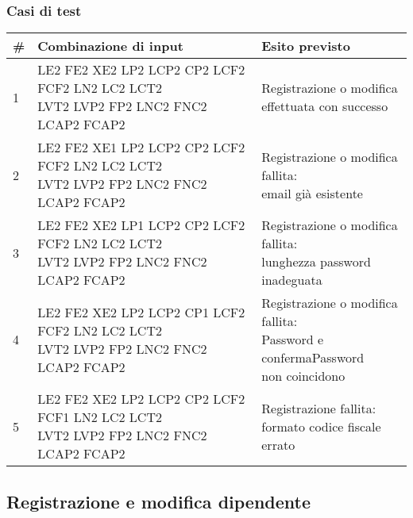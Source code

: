 \documentclass[12pt]{article}
\begin{document}
\subsubsection{Casi di test}
\begin{center}
\begin{tabular}{|l|l|l|}
\hline
\rowcolor[HTML]{C0C0C0} \textbf{\#} & \textbf{Combinazione di input} & \textbf{Esito previsto}  \\ \hline
1 & \makecell{LE2 FE2 XE2 LP2 LCP2 CP2 LCF2 FCF2 LN2 LC2 LCT2\\ LVT2 LVP2 FP2 LNC2 FNC2 LCAP2 FCAP2} & \makecell{Registrazione o modifica \\ effettuata con successo} \\ \hline
2 & \makecell{LE2 FE2 XE1 LP2 LCP2 CP2 LCF2 FCF2 LN2 LC2 LCT2\\ LVT2 LVP2 FP2 LNC2 FNC2 LCAP2 FCAP2}  & \makecell{Registrazione o modifica fallita:\\ email già esistente} \\ \hline
3 & \makecell{LE2 FE2 XE2 LP1 LCP2 CP2 LCF2 FCF2 LN2 LC2 LCT2\\ LVT2 LVP2 FP2 LNC2 FNC2 LCAP2 FCAP2}  & \makecell{Registrazione o modifica fallita:\\ lunghezza password inadeguata} \\ \hline
4 &\makecell{LE2 FE2 XE2 LP2 LCP2 CP1 LCF2 FCF2 LN2 LC2 LCT2\\ LVT2 LVP2 FP2 LNC2 FNC2 LCAP2 FCAP2}  & \makecell{ Registrazione o modifica fallita:\\ Password e confermaPassword \\ non coincidono} \\ \hline
5 & \makecell{LE2 FE2 XE2 LP2 LCP2 CP2 LCF2 FCF1 LN2 LC2 LCT2\\ LVT2 LVP2 FP2 LNC2 FNC2 LCAP2 FCAP2}  & \makecell{Registrazione fallita:\\ formato codice fiscale errato} \\ \hline
\end{tabular}
\end{center}

\newpage

\subsection{Registrazione e modifica dipendente}
\end{document}
